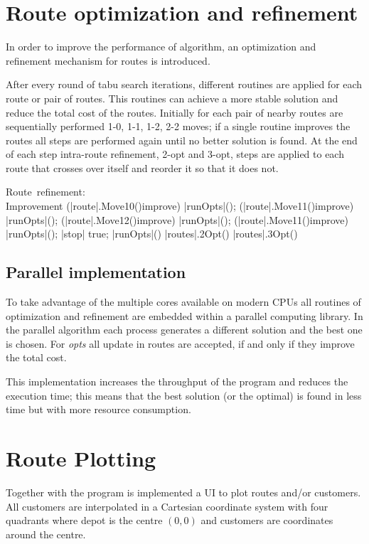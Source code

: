 \documentclass[twoside]{article}
\begin{document}
\begin{multicols}{2}
\section{Route optimization and refinement}
In order to improve the performance of algorithm, an optimization and refinement mechanism for routes is introduced.

After every round of tabu search iterations, different routines are applied for each route or pair of routes. This routines can achieve a more stable solution and reduce the total cost of the routes.\newline
Initially for each pair of nearby routes are sequentially performed 1-0, 1-1, 1-2, 2-2 moves; if a single routine improves the routes all steps are performed again until no better solution is found.
At the end of each step intra-route refinement, 2-opt and 3-opt, steps are applied to each route that crosses over itself and reorder it so that it does not.\\

\begin{program}
	\mbox{Route refinement:}
	\BEGIN \\ %
	\WHILE \NOT Improvement \DO
		\IF (|route|.Move10()\;improve)
			|runOpts|();
		\FI \ELSE \IF (|route|.Move11()\;improve)
			|runOpts|();
		\FI \ELSE \IF (|route|.Move12()\;improve)
			|runOpts|();
		\FI \ELSE \IF (|route|.Move11()\;improve)
			|runOpts|();
		\ELSE |stop| \gets true;
		\FI
	\OD
	\WHERE 
	\PROC |runOpts|() \BODY
		|routes|.2Opt()
		|routes|.3Opt()
	\ENDPROC
	\END
\end{program}

\subsection{Parallel implementation}
To take advantage of the multiple cores available on modern CPUs all routines of optimization and refinement are embedded within a parallel computing library. In the parallel algorithm each process generates a different solution and the best one is chosen. For \textit{opts} all update in routes are accepted, if and only if they improve the total cost.

This implementation increases the throughput of the program and reduces the execution time; this means that the best solution (or the optimal) is found in less time but with more resource consumption. 


\section{Route Plotting}
Together with the program is implemented a UI to plot routes and/or customers.
All customers are interpolated in a Cartesian coordinate system with four quadrants where depot is the centre $(0,0)$ and customers are coordinates around the centre.


\end{multicols}
\end{document}
